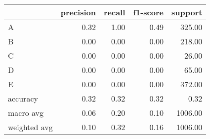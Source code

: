 \begin{tabular}{|l|r|r|r|r|}
\hline
{} &  precision &  recall &  f1-score &  support \\
\hline
A            &       0.32 &    1.00 &      0.49 &   325.00 \\
B            &       0.00 &    0.00 &      0.00 &   218.00 \\
C            &       0.00 &    0.00 &      0.00 &    26.00 \\
D            &       0.00 &    0.00 &      0.00 &    65.00 \\
E            &       0.00 &    0.00 &      0.00 &   372.00 \\
accuracy     &       0.32 &    0.32 &      0.32 &     0.32 \\
macro avg    &       0.06 &    0.20 &      0.10 &  1006.00 \\
weighted avg &       0.10 &    0.32 &      0.16 &  1006.00 \\
\hline
\end{tabular}
